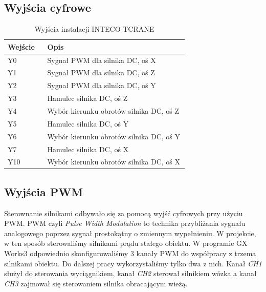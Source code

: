 \subsection{Wyjścia cyfrowe}
\label{Opis::IO::Output}

\begin{table}[H]
    \centering
    \begin{tabular}{|p{0.1\linewidth}|p{0.6\linewidth}|}
	\hline
    Wejście & Opis \\ \hline
    Y0 & Sygnał PWM dla silnika DC, oś X  \\  \hline
	Y1 & Sygnał PWM dla silnika DC, oś Z  \\ \hline
	Y2 & Sygnał PWM dla silnika DC, oś Y  \\ \hline
	Y3 & Hamulec silnika DC, oś Z 		  \\  \hline
	Y4 & Wybór kierunku obrotów silnika DC, oś Z         \\ \hline
	Y5 & Hamulec silnika DC, oś Y 		  \\  \hline
	Y6 & Wybór kierunku obrotów silnika DC, oś Y         \\ \hline
    Y7 & Hamulec silnika DC, oś X 		  \\  \hline
    Y10 & Wybór kierunku obrotów silnika DC, oś X         \\ \hline
	\end{tabular}
	\caption{Wyjścia instalacji INTECO TCRANE}
\end{table}


\subsection{Wyjścia PWM}
\label{PLC::Konfiguracja::PWM}
Sterownanie silnikami odbywało się za pomocą wyjść cyfrowych przy użyciu PWM. PWM czyli \emph{Pulse Width Modulation} to 
technika przybliżania sygnału analogowego poprzez sygnał prostokątny o zmiennym wypełnieniu. W projekcie,
w ten sposób sterowaliśmy silnikami prądu stałego obiektu. W programie GX Works3 odpowiednio
skonfigurowaliśmy 3 kanały PWM do współpracy z trzema silnikami obiektu. Do dalszej pracy 
wykorzystaliśmy tylko dwa z nich. Kanał \emph{CH1} służył do sterowania wyciągnikiem, kanał \emph{CH2}
sterował silnikiem wózka a kanał \emph{CH3} zajmował się sterowaniem silnika obracającym wieżą.

\newpage

